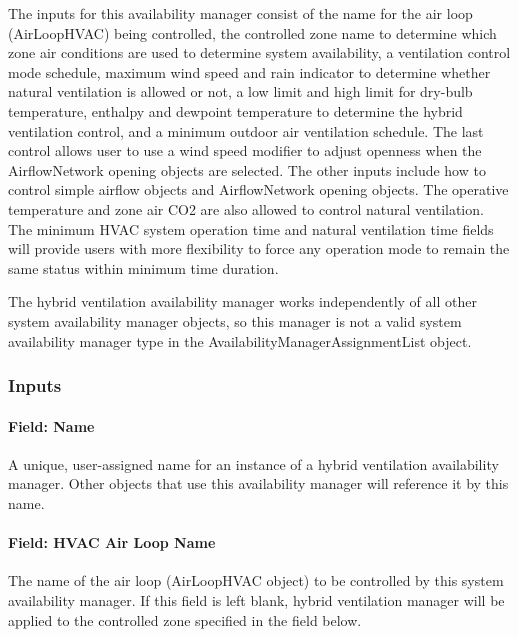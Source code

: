 The inputs for this availability manager consist of the name for the air loop (AirLoopHVAC) being controlled, the controlled zone name to determine which zone air conditions are used to determine system availability, a ventilation control mode schedule, maximum wind speed and rain indicator to determine whether natural ventilation is allowed or not, a low limit and high limit for dry-bulb temperature, enthalpy and dewpoint temperature to determine the hybrid ventilation control, and a minimum outdoor air ventilation schedule. The last control allows user to use a wind speed modifier to adjust openness when the AirflowNetwork opening objects are selected. The other inputs include how to control simple airflow objects and AirflowNetwork opening objects. The operative temperature and zone air CO2 are also allowed to control natural ventilation. The minimum HVAC system operation time and natural ventilation time fields will provide users with more flexibility to force any operation mode to remain the same status within minimum time duration.

The hybrid ventilation availability manager works independently of all other system availability manager objects, so this manager is not a valid system availability manager type in the AvailabilityManagerAssignmentList object.

\subsubsection{Inputs}\label{inputs-10-021}

\paragraph{Field: Name}\label{field-name-9-018}

A unique, user-assigned name for an instance of a hybrid ventilation availability manager. Other objects that use this availability manager will reference it by this name.

\paragraph{Field: HVAC Air Loop Name}\label{field-hvac-air-loop-name-000}

The name of the air loop (AirLoopHVAC object) to be controlled by this system availability manager. If this field is left blank, hybrid ventilation manager will be applied to the controlled zone specified in the field below.

